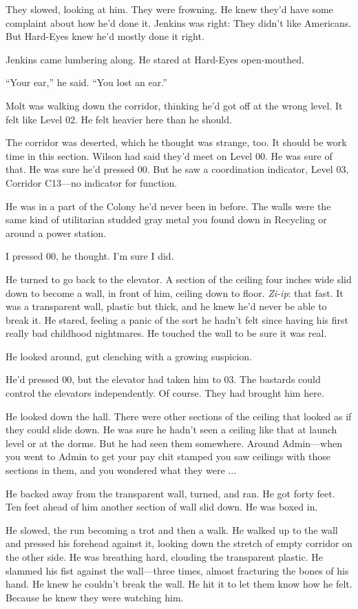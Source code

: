 They slowed, looking at him. They were frowning. He knew they'd have some complaint about how he'd done it. Jenkins was right: They didn't like Americans. But Hard-Eyes knew he'd mostly done it right.

Jenkins came lumbering along. He stared at Hard-Eyes open-mouthed.

``Your ear,'' he said. ``You lost an ear.''

Molt was walking down the corridor, thinking he'd got off at the wrong level. It felt like Level 02. He felt heavier here than he should.

The corridor was deserted, which he thought was strange, too. It should be work time in this section. Wilson had said they'd meet on Level 00. He was sure of that. He was sure he'd pressed 00. But he saw a coordination indicator, Level 03, Corridor C13---no indicator for function.

He was in a part of the Colony he'd never been in before. The walls were the same kind of utilitarian studded gray metal you found down in Recycling or around a power station.

I pressed 00, he thought. I'm sure I did.

He turned to go back to the elevator. A section of the ceiling four inches wide slid down to become a wall, in front of him, ceiling down to floor. \textit{Zi-ip}: that fast. It was a transparent wall, plastic but thick, and he knew he'd never be able to break it. He stared, feeling a panic of the sort he hadn't felt since having his first really bad childhood nightmares. He touched the wall to be sure it was real.

He looked around, gut clenching with a growing suspicion.

He'd pressed 00, but the elevator had taken him to 03. The bastards could control the elevators independently. Of course. They had brought him here.

He looked down the hall. There were other sections of the ceiling that looked as if they could slide down. He was sure he hadn't seen a ceiling like that at launch level or at the dorms. But he had seen them somewhere. Around Admin---when you went to Admin to get your pay chit stamped you saw ceilings with those sections in them, and you wondered what they were ...

He backed away from the transparent wall, turned, and ran. He got forty feet. Ten feet ahead of him another section of wall slid down. He was boxed in.

He slowed, the run becoming a trot and then a walk. He walked up to the wall and pressed his forehead against it, looking down the stretch of empty corridor on the other side. He was breathing hard, clouding the transparent plastic. He slammed his fist against the wall---three times, almost fracturing the bones of his hand. He knew he couldn't break the wall. He hit it to let them know how he felt. Because he knew they were watching him.

